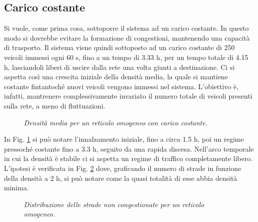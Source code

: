 \documentclass[../main.tex]{subfiles}
\begin{document}
\subsection{Carico costante}
Si vuole, come prima cosa, sottoporre il sistema ad un carico costante.
In questo modo si dovrebbe evitare la formazione di congestioni, mantenendo una capacit\`a di trasporto.
Il sistema viene quindi sottoposto ad un carico costante di 250 veicoli immessi ogni 60 s, fino a un tempo di 3.33 h, per un tempo totale di 4.15 h, lasciandoli liberi di uscire dalla rete una volta giunti a destinazione.
Ci si aspetta cos\`i una crescita iniziale della densit\`a media, la quale si mantiene costante fintantoch\'e nuovi veicoli vengono immessi nel sistema.
L'obiettivo \`e, infatti, mantrenere complessivamente invariato il numero totale di veicoli presenti sulla rete, a meno di fluttuazioni.
\begin{figure}[H]
    \centering
    \caption[Densit\`a media per un reticolo omogeneo con carico costante]{\emph{Densit\`a media per un reticolo omogeneo con carico costante.}}
    \label{fig:density_constant_homo}
\end{figure}
In Fig. \ref{fig:density_constant_homo} si pu\`o notare l'innalzamento iniziale, fino a circa 1.5 h, poi un regime pressoch\'e costante fino a 3.3 h, seguito da una rapida discesa.
Nell'arco temporale in cui la densit\`a \`e stabile ci si aspetta un regime di traffico completamente libero.
L'ipotesi \`e verificata in Fig. \ref{fig:nStreet_density_constant_homo} dove, graficando il numero di strade in funzione della densit\`a a 2 h, si pu\`o notare come la quasi totalit\`a di esse abbia densit\`a minima.
\begin{figure}[H]
    \centering
    \caption[Distribuzione delle strade non congestionate per un reticolo omogeneo.]{\emph{Distribuzione delle strade non congestionate per un reticolo omogeneo.}}
    \label{fig:nStreet_density_constant_homo}
\end{figure}
\end{document}
